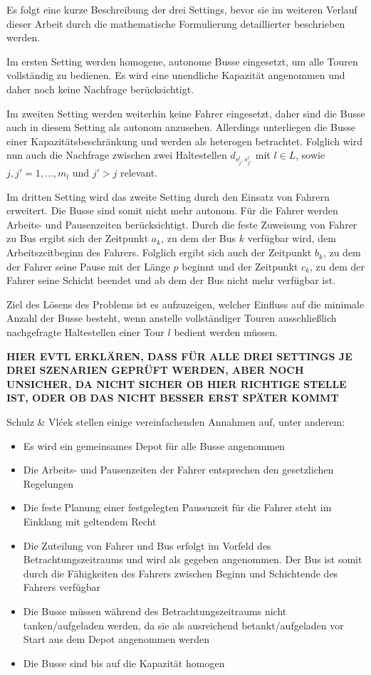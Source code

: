 Es folgt eine kurze Beschreibung der drei Settings, bevor sie im weiteren Verlauf dieser Arbeit durch die mathematische Formulierung detaillierter beschrieben werden.

Im ersten Setting werden homogene, autonome Busse eingesetzt, um alle Touren vollständig zu bedienen. Es wird eine unendliche Kapazität angenommen und daher noch keine Nachfrage berücksichtigt.

Im zweiten Setting werden weiterhin keine Fahrer eingesetzt, daher sind die Busse auch in diesem Setting als autonom anzusehen. Allerdings unterliegen die Busse einer Kapazitätsbeschränkung und werden als heterogen betrachtet. Folglich wird nun auch die Nachfrage zwischen zwei Haltestellen $d_{s^l_j, s^l_{j'}}$ mit $l \in L$, sowie $j, j' = 1, \dots, m_l$ und $j' > j$ relevant. %

Im dritten Setting wird das zweite Setting durch den Einsatz von Fahrern erweitert. Die Busse sind somit nicht mehr autonom. Für die Fahrer werden Arbeits- und Pausenzeiten berücksichtigt. Durch die feste Zuweisung von Fahrer zu Bus ergibt sich der Zeitpunkt $a_k$, zu dem der Bus $k$ verfügbar wird, dem Arbeitszeitbeginn des Fahrers. Folglich ergibt sich auch der Zeitpunkt $b_k$, zu dem der Fahrer seine Pause mit der Länge $p$ beginnt und der Zeitpunkt $c_k$, zu dem der Fahrer seine Schicht beendet und ab dem der Bus nicht mehr verfügbar ist. 

Ziel des Lösens des Problems ist es aufzuzeigen, welcher Einfluss auf die minimale Anzahl der Busse besteht, wenn anstelle vollständiger Touren ausschließlich nachgefragte Haltestellen einer Tour $l$ bedient werden müssen.

\textbf{HIER EVTL ERKLÄREN, DASS FÜR ALLE DREI SETTINGS JE DREI SZENARIEN GEPRÜFT WERDEN, ABER NOCH UNSICHER, DA NICHT SICHER OB HIER RICHTIGE STELLE IST, ODER OB DAS NICHT BESSER ERST SPÄTER KOMMT}

Schulz \& Vlćek stellen einige vereinfachenden Annahmen auf, unter anderem:
\begin{itemize}
    \item Es wird ein gemeinsames Depot für alle Busse angenommen
    \item Die Arbeits- und Pausenzeiten der Fahrer entsprechen den gesetzlichen Regelungen
    \item Die feste Planung einer festgelegten Pausenzeit für die Fahrer steht im Einklang mit geltendem Recht
    \item Die Zuteilung von Fahrer und Bus erfolgt im Vorfeld des Betrachtungszeitraums und wird als gegeben angenommen. Der Bus ist somit durch die Fähigkeiten des Fahrers zwischen Beginn und  Schichtende des Fahrers verfügbar
    \item Die Busse müssen während des Betrachtungszeitraums nicht tanken/aufgeladen werden, da sie als ausreichend betankt/aufgeladen vor Start aus dem Depot angenommen werden
    \item Die Busse sind bis auf die Kapazität homogen
\end{itemize}



